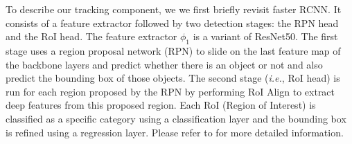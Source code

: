 
To describe our tracking component, we we first briefly revisit faster RCNN. It consists of a feature extractor followed by two detection stages: the RPN head and the RoI head.
The feature extractor $\phi_{1}$ is a variant of ResNet50. The first stage uses a region proposal network (RPN) to slide on the last feature map of the backbone layers and predict whether there is an object or not and also predict the bounding box of those objects. The second stage (\textit{i.e.}, RoI head) is run for each region proposed by the RPN by performing RoI Align \cite{He2018MaskR} to extract deep features from this proposed region. 
Each RoI (Region of Interest) is classified as a specific category using a classification layer and the bounding box is refined using a regression layer.
Please refer to \cite{ren2015faster} for more detailed information.


